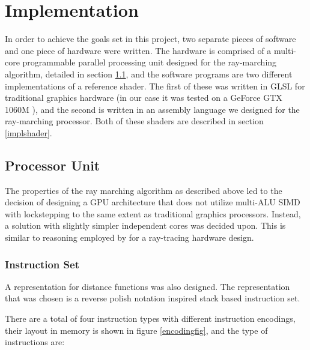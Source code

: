 \chapter{Implementation}
	
	In order to achieve the goals set in this project, two separate pieces of software and one piece of
	hardware were written. The hardware is comprised of a multi-core
	programmable parallel processing unit designed for the ray-marching
	algorithm, detailed in section \ref{implproc}, and the software programs
	are two different implementations of a reference shader.  The first of
	these was written in GLSL for traditional graphics hardware (in our case 
	it was tested on a GeForce GTX 1060M ), and the second is written in an 
	assembly language we designed for the ray-marching processor. Both of 
	these shaders are described in section \ref{implshader}.
	
	\section{Processor Unit} \label{implproc}

		The properties of the ray marching algorithm as described above led to
		the decision of designing a GPU architecture that does not utilize
		multi-ALU SIMD with lockstepping to the same extent as traditional
		graphics processors. Instead, a solution with slightly simpler
		independent cores was decided upon. This is similar to reasoning
		employed by \cite{Woop2005} for a ray-tracing hardware design.
	
		\subsection{Instruction Set}

			A representation for distance functions was also designed. The
			representation that was chosen is a reverse polish notation
			inspired stack based instruction set.
	
			There are a total of four instruction types with different
			instruction encodings, their layout in memory is shown in figure
			\ref{encodingfig}, and the type of instructions are:

